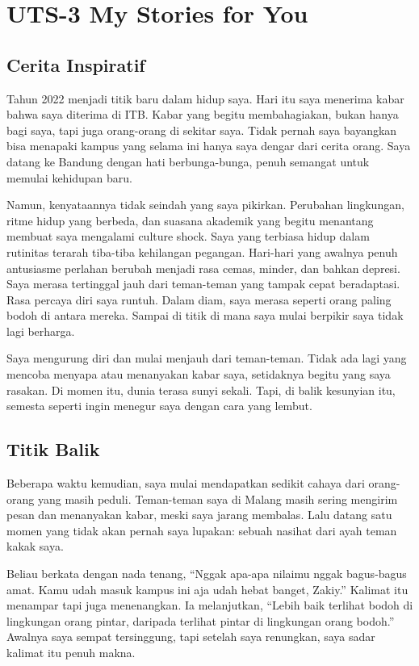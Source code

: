 \documentclass[
  letterpaper,
  DIV=11,
  numbers=noendperiod]{scrreprt}
\begin{document}
\chapter{UTS-3 My Stories for You}\label{uts-3-my-stories-for-you}

\section{Cerita Inspiratif}\label{cerita-inspiratif}

Tahun 2022 menjadi titik baru dalam hidup saya. Hari itu saya menerima
kabar bahwa saya diterima di ITB. Kabar yang begitu membahagiakan, bukan
hanya bagi saya, tapi juga orang-orang di sekitar saya. Tidak pernah
saya bayangkan bisa menapaki kampus yang selama ini hanya saya dengar
dari cerita orang. Saya datang ke Bandung dengan hati berbunga-bunga,
penuh semangat untuk memulai kehidupan baru.

Namun, kenyataannya tidak seindah yang saya pikirkan. Perubahan
lingkungan, ritme hidup yang berbeda, dan suasana akademik yang begitu
menantang membuat saya mengalami culture shock. Saya yang terbiasa hidup
dalam rutinitas terarah tiba-tiba kehilangan pegangan. Hari-hari yang
awalnya penuh antusiasme perlahan berubah menjadi rasa cemas, minder,
dan bahkan depresi. Saya merasa tertinggal jauh dari teman-teman yang
tampak cepat beradaptasi. Rasa percaya diri saya runtuh. Dalam diam,
saya merasa seperti orang paling bodoh di antara mereka. Sampai di titik
di mana saya mulai berpikir saya tidak lagi berharga.

Saya mengurung diri dan mulai menjauh dari teman-teman. Tidak ada lagi
yang mencoba menyapa atau menanyakan kabar saya, setidaknya begitu yang
saya rasakan. Di momen itu, dunia terasa sunyi sekali. Tapi, di balik
kesunyian itu, semesta seperti ingin menegur saya dengan cara yang
lembut.

\section{Titik Balik}\label{titik-balik}

Beberapa waktu kemudian, saya mulai mendapatkan sedikit cahaya dari
orang-orang yang masih peduli. Teman-teman saya di Malang masih sering
mengirim pesan dan menanyakan kabar, meski saya jarang membalas. Lalu
datang satu momen yang tidak akan pernah saya lupakan: sebuah nasihat
dari ayah teman kakak saya.

Beliau berkata dengan nada tenang, ``Nggak apa-apa nilaimu nggak
bagus-bagus amat. Kamu udah masuk kampus ini aja udah hebat banget,
Zakiy.'' Kalimat itu menampar tapi juga menenangkan. Ia melanjutkan,
``Lebih baik terlihat bodoh di lingkungan orang pintar, daripada
terlihat pintar di lingkungan orang bodoh.'' Awalnya saya sempat
tersinggung, tapi setelah saya renungkan, saya sadar kalimat itu penuh
makna.
\end{document}
